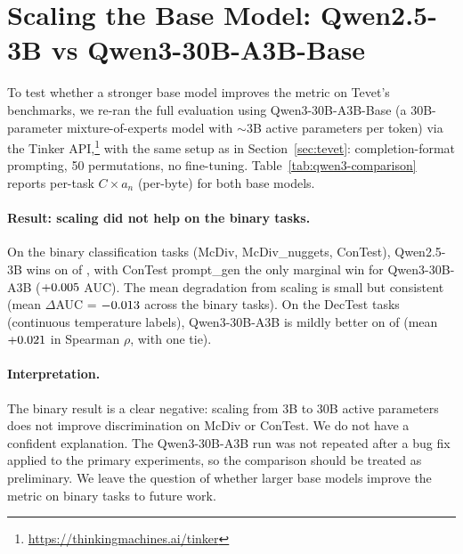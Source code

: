 \section{Scaling the Base Model: Qwen2.5-3B vs Qwen3-30B-A3B-Base}\label{app:qwen3-comparison}

To test whether a stronger base model improves the metric on Tevet's benchmarks, we re-ran the full evaluation using Qwen3-30B-A3B-Base \citep{yang2025qwen3} (a 30B-parameter mixture-of-experts model with $\sim$3B active parameters per token) via the Tinker API,\footnote{\url{https://thinkingmachines.ai/tinker}} with the same setup as in Section~\ref{sec:tevet}: completion-format prompting, 50 permutations, no fine-tuning.
Table~\ref{tab:qwen3-comparison} reports per-task $C \times a_n$ (per-byte) for both base models.

\begin{table}[!t]
\centering
\caption{Per-task comparison of $C \times a_n$ (per-byte) for Qwen2.5-3B vs Qwen3-30B-A3B-Base on Tevet diversity-eval. $\Delta$AUC is positive when the larger model wins.
ROC AUC is reported for the binary tasks (McDiv, McDiv\_nuggets, ConTest); only Spearman $\rho$ is meaningful for DecTest (continuous temperature labels).}
\label{tab:qwen3-comparison}
\small

\end{table}

\paragraph{Result: scaling did not help on the binary tasks.} On the \qwenThreeBinaryTotal{} binary classification tasks (McDiv, McDiv\_nuggets, ConTest), Qwen2.5-3B wins on \qwenThreeBinaryWinsQwenTwoFive{} of \qwenThreeBinaryTotal{}, with ConTest prompt\_gen the only marginal win for Qwen3-30B-A3B ($+0.005$ AUC).
The mean degradation from scaling is small but consistent (mean $\Delta$AUC = $-0.013$ across the \qwenThreeBinaryTotal{} binary tasks).
On the \qwenThreeDecTestTotal{} DecTest tasks (continuous temperature labels), Qwen3-30B-A3B is mildly better on \qwenThreeDecTestWins{} of \qwenThreeDecTestTotal{} (mean $+0.021$ in Spearman $\rho$, with one tie).

\paragraph{Interpretation.} The binary result is a clear negative: scaling from 3B to 30B active parameters does not improve discrimination on McDiv or ConTest.
We do not have a confident explanation.
The Qwen3-30B-A3B run was not repeated after a bug fix applied to the primary experiments, so the comparison should be treated as preliminary.
We leave the question of whether larger base models improve the metric on binary tasks to future work.
